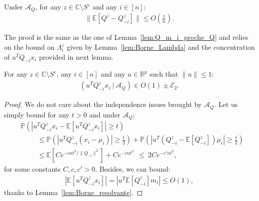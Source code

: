 \documentclass[a4papaer, titlepage]{book}
\begin{document}
\begin{lemma}\label{lem:Q_m_Q_m_i}
  Under $\mathcal A_Q$, for any $z \in \mathbb C \setminus S^\varepsilon$ and any $i \in [n]$:
  \begin{align*}
    \|\mathbb E[Q^z - Q^z_{-i}]\| \leq O \left( \frac{1}{n} \right).
  \end{align*}
\end{lemma}
The proof is the same as the one of Lemma~\ref{lem:Q_m_i_proche_Q} and relies on the bound on $\Lambda_i^z$ given by Lemma~\ref{lem:Borne_Lambda} and the concentration of $u^TQ_{-i}x_i$ provided in next lemma.
\begin{lemma}\label{lem:uQx}
  For any $z \in \mathbb C \setminus S^\varepsilon$, any $i \in [n]$ and any $u \in \mathbb R^p$ such that $\|u\|\leq 1$:
  \begin{align*}
    (u^T Q_{-i}^zx_i \ | \ \mathcal A_Q)
     \in O(1) \pm \mathcal E_2.
  \end{align*}
\end{lemma}
\begin{proof}
    We do not care about the independence issues brought by $\mathcal A_Q$. Let us simply bound for any $t>0$ and under $\mathcal A_Q$:
    \begin{align*}
      &\mathbb P \left( \left\vert u^T Q_{-i}^zx_i - \mathbb E \left[  u^T Q_{-i}^zx_i\right] \right\vert \geq t \right)\\
      &\hspace{1cm}\leq \mathbb P \left( \left\vert u^T Q_{-i}^z(x_i -\mu_i) \right\vert \geq \frac{t}{2} \right)+
      \mathbb P \left( \left\vert u^T  \left( Q_{-i}^z-\mathbb E \left[ Q_{-i}^z\right] \right)\mu_i \right\vert \geq \frac{t}{2} \right)\\
      &\hspace{1cm}\leq \mathbb E \left[ C e^{-cnt^2/\|Q_{-i}\|^2} \right] + C e^{-cnt^2} \ \
      \leq \ 2C e^{-c'nt^2},
    \end{align*}
    for some constants $C,c,c'>0$. Besides, we can bound:
    \begin{align*}
      \left\vert \mathbb E \left[  u^T Q_{-i}^zx_i\right] \right\vert = \left\vert u^T \mathbb E[Q_{-i}^z]m_i \right\vert \leq O(1),
    \end{align*}
    thanks to Lemma~\ref{lem:Borne_resolvante}.

\end{proof}
\end{document}
